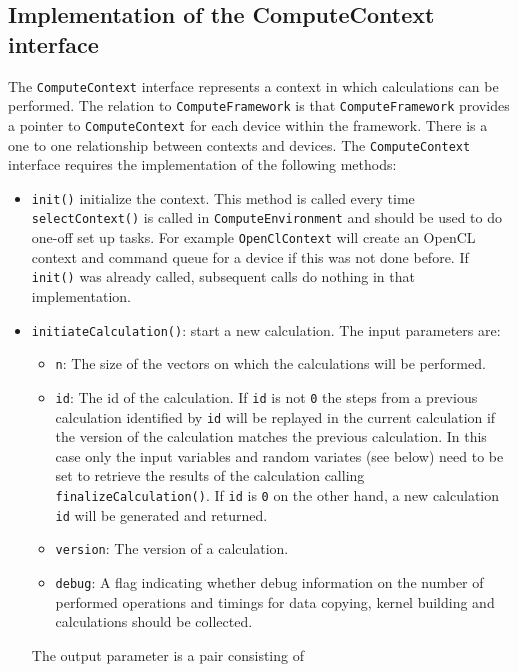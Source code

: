 \documentclass[12pt, a4paper]{article}
\begin{document}
\subsection{Implementation of the ComputeContext interface}\label{implComputeContext}

The \verb+ComputeContext+ interface represents a context in which calculations can be performed. The relation to
\verb+ComputeFramework+ is that \verb+ComputeFramework+ provides a pointer to \verb+ComputeContext+ for each device
within the framework. There is a one to one relationship between contexts and devices. The \verb+ComputeContext+
interface requires the implementation of the following methods:

\begin{itemize}
\item \verb+init()+ initialize the context. This method is called every time \verb+selectContext()+ is called in
  \verb+ComputeEnvironment+ and should be used to do one-off set up tasks. For example \verb+OpenClContext+ will create
  an OpenCL context and command queue for a device if this was not done before. If \verb+init()+ was already called,
  subsequent calls do nothing in that implementation.
\item \verb+initiateCalculation()+: start a new calculation. The input parameters are:
  \begin{itemize}
  \item \verb+n+: The size of the vectors on which the calculations will be performed.
  \item \verb+id+: The id of the calculation. If \verb+id+ is not \verb+0+ the steps from a previous calculation
    identified by \verb+id+ will be replayed in the current calculation if the version of the calculation matches the
    previous calculation. In this case only the input variables and random variates (see below) need to be set to
    retrieve the results of the calculation calling \verb+finalizeCalculation()+. If \verb+id+ is \verb+0+ on the other
    hand, a new calculation \verb+id+ will be generated and returned.
  \item \verb+version+: The version of a calculation.
  \item \verb+debug+: A flag indicating whether debug information on the number of performed operations and timings for
    data copying, kernel building and calculations should be collected.
  \end{itemize}
  The output parameter is a pair consisting of
  \begin{itemize}

\end{itemize}
\end{itemize}
\end{document}
